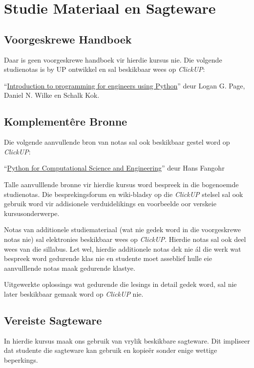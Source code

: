 \section{Studie Materiaal en Sagteware}
    \subsection{Voorgeskrewe Handboek}
        Daar is geen voorgeskrewe handboek vir hierdie kursus nie. Die volgende
        studienotas is by UP ontwikkel en sal beskikbaar wees op
        \textit{ClickUP}:

        ``\underline{Introduction to programming for engineers using Python}''
        deur Logan G. Page, Daniel N. Wilke en Schalk Kok.

    \subsection{Komplement\^{e}re Bronne}
        Die volgende aanvullende bron van notas sal ook beskikbaar gestel word
        op \textit{ClickUP}:

        ``\underline{Python for Computational Science and Engineering}'' deur
        Hans Fangohr

        Talle aanvulllende bronne vir hierdie kursus word bespreek in die
        bogenoemde studienotas.  Die besprekingsforum en wiki-bladsy op die
        \textit{ClickUP} stelsel sal ook gebruik word vir addisionele
        verduidelikings en voorbeelde oor verskeie kursusonderwerpe.

        Notas van additionele studiemateriaal (wat nie gedek word in die
        voorgeskrewe notas nie) sal elektronies beskikbaar wees op
        \textit{ClickUP}. Hierdie notas sal ook deel wees van die sillabus.
        Let wel, hierdie additionele notas dek nie \'{a}l die werk wat bespreek
        word gedurende klas nie en studente moet asseblief hulle eie
        aanvulllende notas maak gedurende klastye.

        Uitgewerkte oplossings wat gedurende die lesings in detail gedek word,
        sal nie later beskikbaar gemaak word op \textit{ClickUP} nie.

    \subsection{Vereiste Sagteware}
        In hierdie kursus maak ons gebruik van vrylik beskikbare sagteware.
        Dit impliseer dat studente die sagteware kan gebruik en kopie\"er
        sonder enige wettige beperkings.

